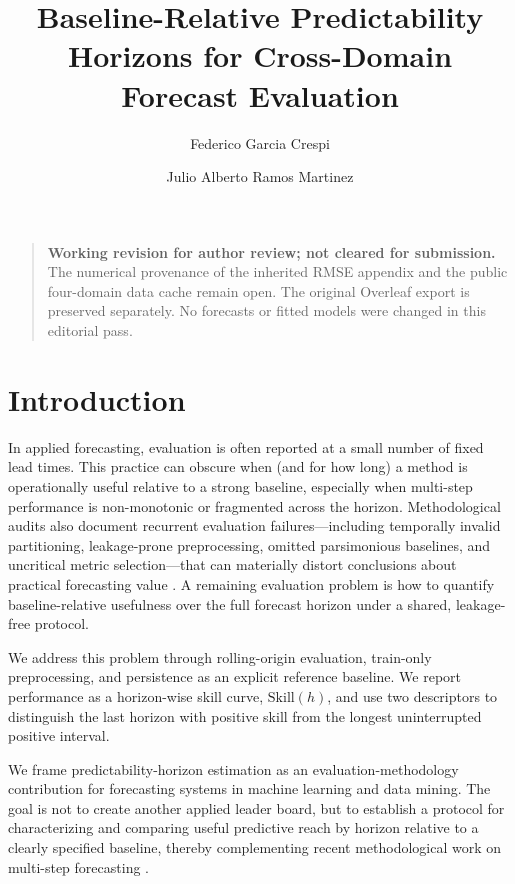\documentclass[pdflatex]{sn-jnl}
\title[Baseline-relative predictability horizons]{Baseline-Relative Predictability Horizons for Cross-Domain Forecast Evaluation}
\author*[1]{Federico Garcia Crespi}
\author[2]{Julio Alberto Ramos Martinez}
\affil[1]{Departamento de Ingenier\'ia de Computadores, Universidad Miguel Hern\'andez, Elche, Spain}
\affil[2]{Departamento de Estad\'istica, Matem\'aticas e Inform\'atica, Universidad Miguel Hern\'andez, Elche, Spain}
\begin{document}
\maketitle

\begin{quote}
\small\textbf{Working revision for author review; not cleared for submission.}
The numerical provenance of the inherited RMSE appendix and the public
four-domain data cache remain open. The original Overleaf export is
preserved separately. No forecasts or fitted models were changed in this
editorial pass.
\end{quote}




\section{Introduction}

In applied forecasting, evaluation is often reported at a small number of fixed lead times. This practice can obscure when (and for how long) a method is operationally useful relative to a strong baseline, especially when multi-step performance is non-monotonic or fragmented across the horizon. Methodological audits also document recurrent evaluation failures—including temporally invalid partitioning, leakage-prone preprocessing, omitted parsimonious baselines, and uncritical metric selection—that can materially distort conclusions about practical forecasting value \citep{hewamalage2023dmkd}. A remaining evaluation problem is how to quantify baseline-relative usefulness over the full forecast horizon under a shared, leakage-free protocol.

We address this problem through rolling-origin evaluation, train-only preprocessing, and persistence as an explicit reference baseline. We report performance as a horizon-wise skill curve, $\mathrm{Skill}(h)$, and use two descriptors to distinguish the last horizon with positive skill from the longest uninterrupted positive interval.

We frame predictability-horizon estimation as an evaluation-methodology contribution for forecasting systems in machine learning and data mining. The goal is not to create another applied leader board, but to establish a protocol for characterizing and comparing useful predictive reach by horizon relative to a clearly specified baseline, thereby complementing recent methodological work on multi-step forecasting \citep{green2025stratify,kreuzer2025trend}.
\end{document}
